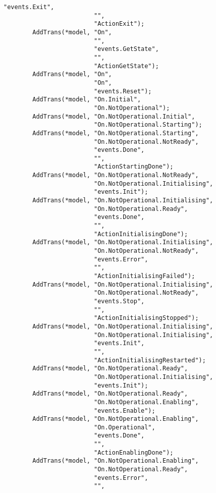 \begin{lstlisting}[language=CXX, label={lst:annex_basic_model}, caption={Basic life cycle without omissions.}]
                         "events.Exit",
                         "",
                         "ActionExit");
        AddTrans(*model, "On",
                         "",
                         "events.GetState",
                         "",
                         "ActionGetState");
        AddTrans(*model, "On",
                         "On",
                         "events.Reset");
        AddTrans(*model, "On.Initial",
                         "On.NotOperational");
        AddTrans(*model, "On.NotOperational.Initial",
                         "On.NotOperational.Starting");
        AddTrans(*model, "On.NotOperational.Starting",
                         "On.NotOperational.NotReady",
                         "events.Done",
                         "",
                         "ActionStartingDone");
        AddTrans(*model, "On.NotOperational.NotReady",
                         "On.NotOperational.Initialising",
                         "events.Init");
        AddTrans(*model, "On.NotOperational.Initialising",
                         "On.NotOperational.Ready",
                         "events.Done",
                         "",
                         "ActionInitialisingDone");
        AddTrans(*model, "On.NotOperational.Initialising",
                         "On.NotOperational.NotReady",
                         "events.Error",
                         "",
                         "ActionInitialisingFailed");
        AddTrans(*model, "On.NotOperational.Initialising",
                         "On.NotOperational.NotReady",
                         "events.Stop",
                         "",
                         "ActionInitialisingStopped");
        AddTrans(*model, "On.NotOperational.Initialising",
                         "On.NotOperational.Initialising",
                         "events.Init",
                         "",
                         "ActionInitialisingRestarted");
        AddTrans(*model, "On.NotOperational.Ready",
                         "On.NotOperational.Initialising",
                         "events.Init");
        AddTrans(*model, "On.NotOperational.Ready",
                         "On.NotOperational.Enabling",
                         "events.Enable");
        AddTrans(*model, "On.NotOperational.Enabling",
                         "On.Operational",
                         "events.Done",
                         "",
                         "ActionEnablingDone");
        AddTrans(*model, "On.NotOperational.Enabling",
                         "On.NotOperational.Ready",
                         "events.Error",
                         "",

\end{lstlisting}
